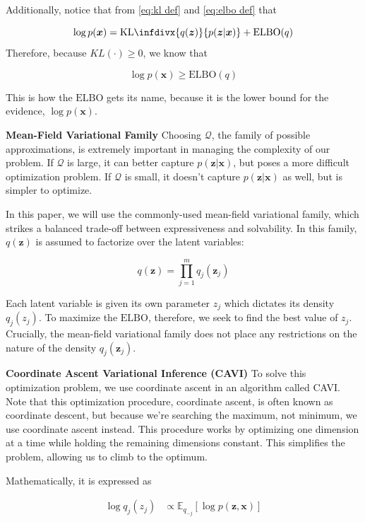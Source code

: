 \documentclass[letterpaper,12pt]{article}
\newcommand{\B}[1]{\mathbf{#1}} %
\newcommand{\px}{\ensuremath{p(\boldsymbol{x})}}
\newcommand{\pzx}{\ensuremath{p(\boldsymbol{z}, \boldsymbol{x})}}
\newcommand{\pzgivenx}{\ensuremath{p(\boldsymbol{z} | \boldsymbol{x})}}
\newcommand{\qz}{\ensuremath{q(\boldsymbol{z})}}
\newcommand{\kld}[2]{\ensuremath{\mathrm{KL}\infdivx{#1}{#2}}\xspace}
\newcommand{\elboq}{\ensuremath{\mathrm{ELBO}(q)}}
\newcommand{\elbo}{\ensuremath{\mathrm{ELBO}}}
\newcommand{\el}{\left[} %
\newcommand{\er}{\right]} %
\begin{document}
Additionally, notice that from \autoref{eq:kl def} and \autoref{eq:elbo def} that

\begin{equation}
    \log \px = \kld{\qz}{\pzgivenx} + \elboq
\end{equation}
Therefore, because $KL(\cdot) \geq 0$, we know that

\begin{equation}
    \log \px \geq \elboq
\end{equation}

\noindent This is how the $\elbo$ gets its name, because it is the lower bound for the evidence, $\log \px$.

\textbf{Mean-Field Variational Family} Choosing $\mathcal{Q}$, the family of possible approximations, is extremely important in managing the complexity of our problem. If $\mathcal{Q}$ is large, it can better capture \pzgivenx, but poses a more difficult optimization problem. If $\mathcal{Q}$ is small, it doesn't capture $\pzgivenx$ as well, but is simpler to optimize.

In this paper, we will use the commonly-used mean-field variational family, which strikes a balanced trade-off between expressiveness and solvability. In this family, $\qz$ is assumed to factorize over the latent variables:

\begin{equation}
    \qz = \prod_{j=1}^m q_j(\B{z}_j)
\end{equation}


Each latent variable is given its own parameter $z_j$ which dictates its density $q_j(z_j)$. To maximize the $\elbo$, therefore, we seek to find the best value of $z_j$. Crucially, the mean-field variational family does not place any restrictions on the nature of the density $q_j(\B{z}_j)$.

\textbf{Coordinate Ascent Variational Inference (CAVI)}
To solve this optimization problem, we use coordinate ascent in an algorithm called CAVI. Note that this optimization procedure, coordinate ascent, is often known as coordinate descent, but because we're searching the maximum, not minimum, we use coordinate ascent instead. This procedure works by optimizing one dimension at a time while holding the remaining dimensions constant. This simplifies the problem, allowing us to climb to the optimum.

Mathematically, it is expressed as

\begin{equation}
\begin{split}
    \log q_j(z_j) &\propto \mathbb{E}_{q_{-j}} \el \log \pzx \er
\end{split}
\end{equation}
    
\end{document}
